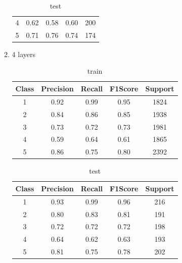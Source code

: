 \begin{enumerate}[label=(\alph*)]
\begin{enumerate}[label=\roman*.]
\begin{table}[!htb]
\begin{tabular}{ccccc}
                            4     & 0.62      & 0.58   & 0.60    & 200     \\
                            5     & 0.71      & 0.76   & 0.74    & 174     \\ \hline
                        \end{tabular}
                        \caption{test}
                        \label{part e test depth 3}
                    \end{table}
                    \newpage
              \item 4 layers
                    \begin{table}[!htb]
                        \centering
                        \begin{tabular}{ccccc}
                            \hline
                            Class & Precision & Recall & F1Score & Support \\ \hline
                            1     & 0.92      & 0.99   & 0.95    & 1824    \\
                            2     & 0.84      & 0.86   & 0.85    & 1938    \\
                            3     & 0.73      & 0.72   & 0.73    & 1981    \\
                            4     & 0.59      & 0.64   & 0.61    & 1865    \\
                            5     & 0.86      & 0.75   & 0.80    & 2392    \\ \hline
                        \end{tabular}
                        \caption{train}
                        \label{part e train depth 4}
                    \end{table}
                    \begin{table}[!htb]
                        \centering
                        \begin{tabular}{ccccc}
                            \hline
                            Class & Precision & Recall & F1Score & Support \\ \hline
                            1     & 0.93      & 0.99   & 0.96    & 216     \\
                            2     & 0.80      & 0.83   & 0.81    & 191     \\
                            3     & 0.72      & 0.72   & 0.72    & 198     \\
                            4     & 0.64      & 0.62   & 0.63    & 193     \\
                            5     & 0.81      & 0.75   & 0.78    & 202     \\ \hline
                        \end{tabular}
                        \caption{test}
                        \label{part e test depth 4}
                    \end{table}


\end{enumerate}
\end{enumerate}
